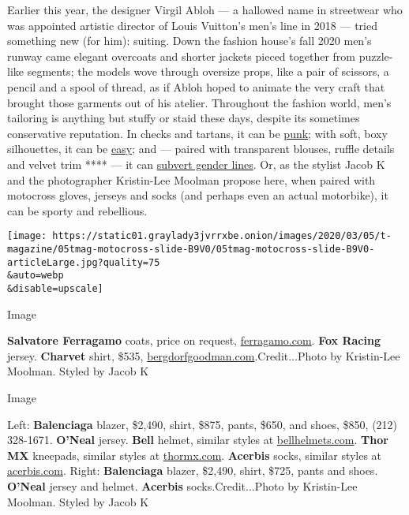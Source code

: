 Earlier this year, the designer Virgil Abloh --- a hallowed name in
streetwear who was appointed artistic director of Louis Vuitton's men's
line in 2018 --- tried something new (for him): suiting. Down the
fashion house's fall 2020 men's runway came elegant overcoats and
shorter jackets pieced together from puzzle-like segments; the models
wove through oversize props, like a pair of scissors, a pencil and a
spool of thread, as if Abloh hoped to animate the very craft that
brought those garments out of his atelier. Throughout the fashion world,
men's tailoring is anything but stuffy or staid these days, despite its
sometimes conservative reputation. In checks and tartans, it can be
\href{https://www.nytimes3xbfgragh.onion/2018/08/28/t-magazine/fashion/tailored-plaid-mens-fall-fashion.html}{punk};
with soft, boxy silhouettes, it can be
\href{https://www.nytimes3xbfgragh.onion/2019/09/10/t-magazine/mens-fall-fashion.html}{easy};
and --- paired with transparent blouses, ruffle details and velvet trim
**** --- it can
\href{https://www.nytimes3xbfgragh.onion/2019/08/05/t-magazine/fall-fashion-androgyny.html}{subvert
gender lines}. Or, as the stylist Jacob K and the photographer
Kristin-Lee Moolman propose here, when paired with motocross gloves,
jerseys and socks (and perhaps even an actual motorbike), it can be
sporty and rebellious.

\texttt{[image: https://static01.graylady3jvrrxbe.onion/images/2020/03/05/t-magazine/05tmag-motocross-slide-B9V0/05tmag-motocross-slide-B9V0-articleLarge.jpg?quality=75\\\&auto=webp\\\&disable=upscale]}

Image

\textbf{Salvatore Ferragamo} coats, price on request,
\href{http://ferragamo.com/}{ferragamo.com}. \textbf{Fox Racing} jersey.
\textbf{Charvet} shirt, \$535,
\href{http://bergdorfgoodman.com/}{bergdorfgoodman.com}.Credit...Photo
by Kristin-Lee Moolman. Styled by Jacob K

Image

Left: \textbf{Balenciaga} blazer, \$2,490, shirt, \$875, pants, \$650,
and shoes, \$850, (212) 328-1671. \textbf{O'Neal} jersey. \textbf{Bell}
helmet, similar styles at
\href{http://bellhelmets.com/}{bellhelmets.com}. \textbf{Thor MX}
kneepads, similar styles at \href{http://thormx.com/}{thormx.com}.
\textbf{Acerbis} socks, similar styles at
\href{http://acerbis.com/}{acerbis.com}. Right: \textbf{Balenciaga}
blazer, \$2,490, shirt, \$725, pants and shoes. \textbf{O'Neal} jersey
and helmet. \textbf{Acerbis} socks.Credit...Photo by Kristin-Lee
Moolman. Styled by Jacob K

